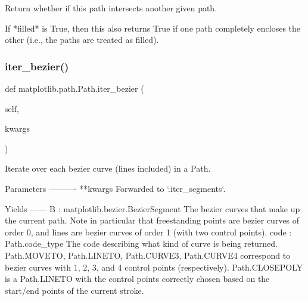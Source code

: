 \begin{DoxyVerb}Return whether if this path intersects another given path.

If *filled* is True, then this also returns True if one path completely
encloses the other (i.e., the paths are treated as filled).
\end{DoxyVerb}
 \mbox{\label{classmatplotlib_1_1path_1_1Path_a94de6154f565d95e26c57eab8aeec81e}} 
\subsubsection{\texorpdfstring{iter\+\_\+bezier()}{iter\_bezier()}}
{\footnotesize\ttfamily def matplotlib.\+path.\+Path.\+iter\+\_\+bezier (\begin{DoxyParamCaption}\item[{}]{self,  }\item[{}]{kwargs }\end{DoxyParamCaption})}

\begin{DoxyVerb}Iterate over each bezier curve (lines included) in a Path.

Parameters
----------
**kwargs
    Forwarded to `.iter_segments`.

Yields
------
B : matplotlib.bezier.BezierSegment
    The bezier curves that make up the current path. Note in particular
    that freestanding points are bezier curves of order 0, and lines
    are bezier curves of order 1 (with two control points).
code : Path.code_type
    The code describing what kind of curve is being returned.
    Path.MOVETO, Path.LINETO, Path.CURVE3, Path.CURVE4 correspond to
    bezier curves with 1, 2, 3, and 4 control points (respectively).
    Path.CLOSEPOLY is a Path.LINETO with the control points correctly
    chosen based on the start/end points of the current stroke.
\end{DoxyVerb}
 \mbox{\label{classmatplotlib_1_1path_1_1Path_a350ad8cb300705d284206e471a2776ab}} 
